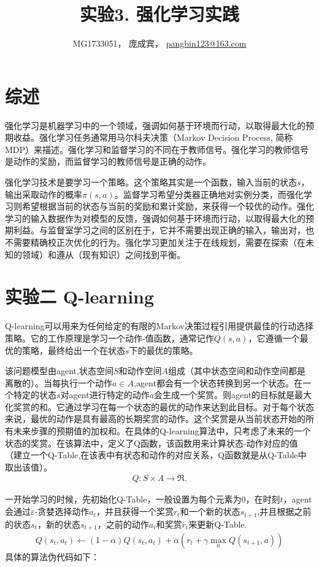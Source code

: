 \documentclass[a4paper,UTF8]{article}
\theoremstyle{definition}
\begin{document}
\title{实验3. 强化学习实践}
\author{MG1733051， 庞成宾， \url{pangbin123@163.com}}
\maketitle

\section*{综述}
	强化学习是机器学习中的一个领域，强调如何基于环境而行动，以取得最大化的预期收益\cite{wiki:reinforcementLearning}。强化学习任务通常用马尔科夫决策（Markov Decision Process, 简称MDP）来描述\cite{zhou2016overview}。强化学习和监督学习的不同在于教师信号。强化学习的教师信号是动作的奖励，而监督学习的教师信号是正确的动作。

    强化学习技术是要学习一个策略。这个策略其实是一个函数，输入当前的状态$s$，输出采取动作的概率$\pi(s,a)$。监督学习希望分类器正确地对实例分类，而强化学习则希望根据当前的状态与当前的奖励和累计奖励，来获得一个较优的动作。强化学习的输入数据作为对模型的反馈，强调如何基于环境而行动，以取得最大化的预期利益。与监督室学习之间的区别在于，它并不需要出现正确的输入，输出对，也不需要精确校正次优化的行为。强化学习更加关注于在线规划，需要在探索（在未知的领域）和遵从（现有知识）之间找到平衡。

\section*{实验二   Q-learning}
	Q-learning可以用来为任何给定的有限的Markov决策过程引用提供最佳的行动选择策略。它的工作原理是学习一个动作-值函数，通常记作$Q(s,a)$，它遵循一个最优的策略，最终给出一个在状态$s$下的最优的策略\cite{wiki:qlearning}。

    该问题模型由agent,状态空间$S$和动作空间$A$组成（其中状态空间和动作空间都是离散的）。当每执行一个动作$a\in A$,agent都会有一个状态转换到另一个状态。在一个特定的状态$s$对agent进行特定的动作$a$会生成一个奖赏。则agent的目标就是最大化奖赏的和。它通过学习在每一个状态的最优的动作来达到此目标。对于每个状态来说，最优的动作是具有最高的长期奖赏的动作。这个奖赏是从当前状态开始的所有未来步骤的预期值的加权和。在具体的Q-learning算法中，只考虑了未来的一个状态的奖赏。在该算法中，定义了Q函数，该函数用来计算状态-动作对应的值（建立一个Q-Table,在该表中有状态和动作的对应关系，Q函数就是从Q-Table中取出该值）。
     \begin{align}
     Q: S \times A \rightarrow \Re.
    \end{align}

    一开始学习的时候，先初始化Q-Table，一般设置为每个元素为0，在时刻$t$，agent会通过$\varepsilon$-贪婪选择动作$a_t$，并且获得一个奖赏$r_t$和一个新的状态$s_{t+1}$,并且根据之前的状态$s_t$，新的状态$s_{t+1}$，之前的动作$a_t$和奖赏$r_t$来更新Q-Table.
     \begin{align}
     Q(s_t,a_t) \leftarrow (1-\alpha)Q(s_t,a_t)+\alpha(r_t+\gamma \max_aQ(s_{t+1},a))
    \end{align}
    具体的算法伪代码如下\cite{zhou2016overview}：
\end{document}

